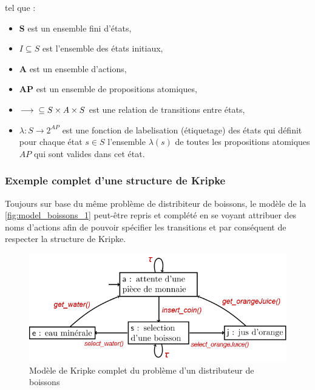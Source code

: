 \documentclass[runningheads,a4paper,10pt]{llncs}
\begin{document}
\noindent
tel que : 
\begin{itemize}
\item \textbf{S} est un ensemble fini d'états, \\
\item \boldmath$I \subseteq S$ est l'ensemble des états initiaux, \\
\item \textbf{A} est un ensemble d'actions, \\
\item \textbf{AP} est un ensemble de propositions atomiques, \\
\item \boldmath$\longrightarrow \hspace{0.2cm} \subseteq S \times A \times S$ est une relation de transitions entre états, \\
\item \boldmath$\lambda : S \rightarrow 2^{AP}$ est une fonction de labelisation (étiquetage) des états qui définit pour chaque état $s \in S$ l'ensemble $\lambda(s)$ de toutes les propositions atomiques $AP$ qui sont valides dans cet état. 


\end{itemize}

\subsubsection{Exemple complet d'une structure de Kripke} 

Toujours sur base du même problème de distribiteur de boissons, le modèle de la \autoref{fig:model_boissons_1} peut-être repris et complété en se voyant attribuer des noms d'actions afin de pouvoir spécifier les transitions et par conséquent de respecter la structure de Kripke. 

\begin{figure}
  \centering
   \includegraphics[scale=0.5]{figures/model-boissons-2.png}
   \caption[Caption for LOF]{Modèle de Kripke complet du problème d'un distributeur de boissons}
   \label{fig:model_boissons_2}
\end{figure}
\end{document}
